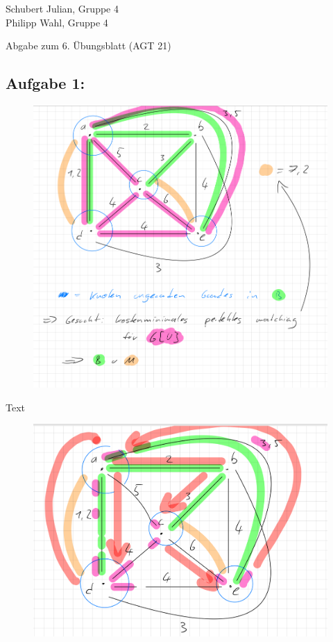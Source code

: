 \documentclass[a4paper]{article}
\begin{document}
\begin{small}
    \noindent
    Schubert Julian, Gruppe 4 \\
    Philipp Wahl, Gruppe 4
\end{small}
\bigskip

\begin{center}
    \LARGE Abgabe zum 6. Übungsblatt (AGT 21)
\end{center}
\smallskip
\subsection*{Aufgabe 1:}
\begin{figure}[htb]
    \centering
    \includegraphics[width=\linewidth]{img/image.png} %
\end{figure}
Text
\begin{figure}[htb]
    \centering
    \includegraphics[width=\linewidth]{img/image2.png} %
\end{figure}
\end{document}
